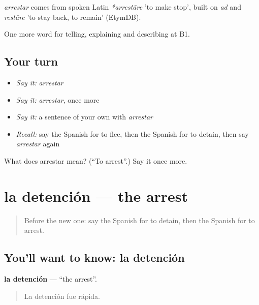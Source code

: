\begin{cousinweb}
\emph{arrestar} comes from spoken Latin \emph{*arrestāre} 'to make stop', built on \emph{ad} and \emph{restāre} 'to stay back, to remain' (EtymDB).
\end{cousinweb}

\begin{grammarlens}[title={What you've built}]
One more word for telling, explaining and describing at B1.
\end{grammarlens}

\subsection*{Your turn}
\begin{itemize}
\raggedright
  \item \emph{Say it:} \emph{arrestar}
  \item \emph{Say it:} \emph{arrestar}, once more
  \item \emph{Say it:} a sentence of your own with \emph{arrestar}
  \item \emph{Recall:} say the Spanish for to flee, then the Spanish for to detain, then say \emph{arrestar} again
\end{itemize}

\begin{tcolorbox}[breakable,colback=teal!4,colframe=teal!35!black,title={Before you move on}]
What does arrestar mean? (\textquotedblleft{}To arrest\textquotedblright{}.) Say it once more.
\end{tcolorbox}
\section[la detención]{la detención — the arrest}

\label{lesson:ES-C519-detencion}



\begin{quote}
Before the new one: say the Spanish for to detain, then the Spanish for to arrest.
\end{quote}

\subsection*{You'll want to know: la detención}
\textbf{la detención} — \textquotedblleft{}the arrest\textquotedblright{}.

\begin{quote}
La detención fue rápida.
\end{quote}

